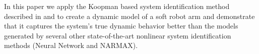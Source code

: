 % 


In this paper we apply the Koopman based system identification method described in \cite{mauroy2016linear} and \cite{mauroy2017koopman} to create a dynamic model of a soft robot arm and demonstrate that it captures the system's true dynamic behavior better than the models generated by several other state-of-the-art nonlinear system identification methods (Neural Network and NARMAX).